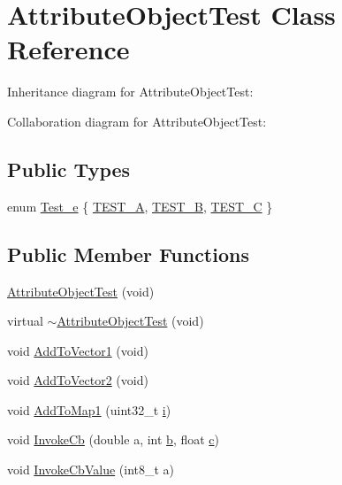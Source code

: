 \hypertarget{classAttributeObjectTest}{}\section{Attribute\+Object\+Test Class Reference}
\label{classAttributeObjectTest}


Inheritance diagram for Attribute\+Object\+Test\+:


Collaboration diagram for Attribute\+Object\+Test\+:
\subsection*{Public Types}
\begin{DoxyCompactItemize}
\item 
enum \hyperlink{classAttributeObjectTest_a7d0dfe3f27ac6d9338a92781caf287cb}{Test\+\_\+e} \{ \hyperlink{classAttributeObjectTest_a7d0dfe3f27ac6d9338a92781caf287cbac83a7f877302882c60d200cc9cc67abe}{T\+E\+S\+T\+\_\+A}, 
\hyperlink{classAttributeObjectTest_a7d0dfe3f27ac6d9338a92781caf287cbacef47df5205983db654b3fc3cdb10865}{T\+E\+S\+T\+\_\+B}, 
\hyperlink{classAttributeObjectTest_a7d0dfe3f27ac6d9338a92781caf287cba34f22f94dd4e890a10784749d81ea296}{T\+E\+S\+T\+\_\+C}
 \}
\end{DoxyCompactItemize}
\subsection*{Public Member Functions}
\begin{DoxyCompactItemize}
\item 
\hyperlink{classAttributeObjectTest_a7ed061a0c3a3d1cabf49f1039b66076e}{Attribute\+Object\+Test} (void)
\item 
virtual \hyperlink{classAttributeObjectTest_a88a98559a6bec029ff5f44f541fe3649}{$\sim$\+Attribute\+Object\+Test} (void)
\item 
void \hyperlink{classAttributeObjectTest_a932bcea4a5820c0214e339cb269d494f}{Add\+To\+Vector1} (void)
\item 
void \hyperlink{classAttributeObjectTest_aec2b26563aca5ad1ac4e290d2f61ec85}{Add\+To\+Vector2} (void)
\item 
void \hyperlink{classAttributeObjectTest_a7ba7b44a088d14a1a7dd7f941d0d1cfd}{Add\+To\+Map1} (uint32\+\_\+t \hyperlink{lte__uplink__power__control_8m_a6f6ccfcf58b31cb6412107d9d5281426}{i})
\item 
void \hyperlink{classAttributeObjectTest_a2a1a4729b1d8f1ff5baec7831abc3977}{Invoke\+Cb} (double a, int \hyperlink{lte__pathloss_8m_a21ad0bd836b90d08f4cf640b4c298e7c}{b}, float \hyperlink{mmwave_2model_2fading-traces_2fading__trace__generator_8m_ae0323a9039add2978bf5b49550572c7c}{c})
\item 
void \hyperlink{classAttributeObjectTest_a72d121c08578e08d02bae4a72231e925}{Invoke\+Cb\+Value} (int8\+\_\+t a)
\end{DoxyCompactItemize}
